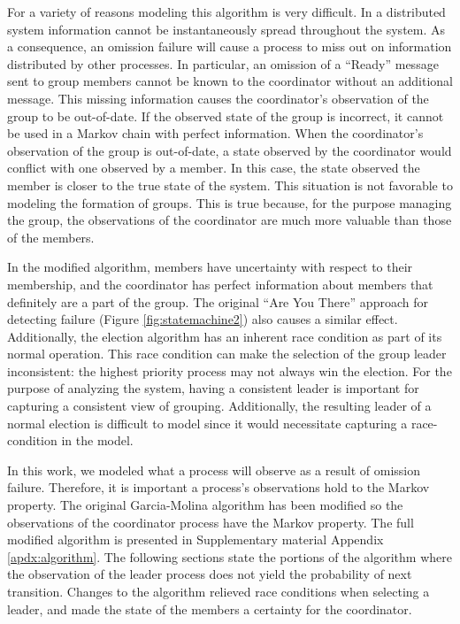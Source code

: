For a variety of reasons modeling this algorithm is very difficult.
In a distributed system information cannot be instantaneously spread throughout the system.
As a consequence, an omission failure will cause a process to miss out on information distributed by other processes.
In particular, an omission of a ``Ready'' message sent to group members cannot be known to the coordinator without an additional message.
This missing information causes the coordinator's observation of the group to be out-of-date.
If the observed state of the group is incorrect, it cannot be used in a Markov chain with perfect information.
When the coordinator's observation of the group is out-of-date, a state observed by the coordinator would conflict with one observed by a member.
In this case, the state observed the member is closer to the true state of the system.
This situation is not favorable to modeling the formation of groups.
This is true because, for the purpose managing the group, the observations of the coordinator are much more valuable than those of the members.

In the modified algorithm, members have uncertainty with respect to their membership, and the coordinator has perfect information about members that definitely are a part of the group.
The original ``Are You There'' approach for detecting failure (Figure \ref{fig:statemachine2}) also causes a similar effect.
Additionally, the election algorithm has an inherent race condition as part of its normal operation.
This race condition can make the selection of the group leader inconsistent: the highest priority process may not always win the election.
For the purpose of analyzing the system, having a consistent leader is important for capturing a consistent view of grouping.
Additionally, the resulting leader of a normal election is difficult to model since it would necessitate capturing a race-condition in the model.

In this work, we modeled what a process will observe as a result of omission failure.
Therefore, it is important a process's observations hold to the Markov property.
The original Garcia-Molina algorithm has been modified so the observations of the coordinator process have the Markov property.
The full modified algorithm is presented in Supplementary material Appendix \ref{apdx:algorithm}.
The following sections state the portions of the algorithm where the observation of the leader process does not yield the probability of next transition.
Changes to the algorithm relieved race conditions when selecting a leader, and made the state of the members a certainty for the coordinator.

